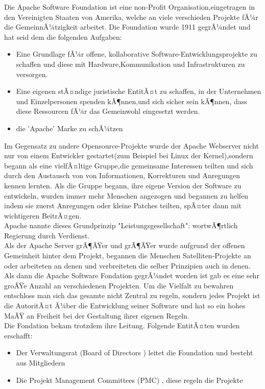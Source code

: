 



Die Apache Software Foundation ist eine non-Profit Organisation,eingetragen in den Vereinigten Staaten von Amerika, welche an viele verschieden Projekte fÃ¼r die GemeinnÃ¼tzigkeit arbeitet. Die Foundation wurde 1911 gegrÃ¼ndet und hat seid dem die folgenden Aufgaben:
\begin{itemize}
\item{Eine Grundlage fÃ¼r offene, kollaborative Software-Entwicklungsprojekte zu schaffen und diese mit Hardware,Kommunikation und Infrastrukturen zu versorgen. }
\item{Eine eigenen stÃ¤ndige juristische EntitÃ¤t zu schaffen, in der Unternehmen und Einzelpersonen spenden kÃ¶nnen,und sich sicher sein kÃ¶nnen, dass diese Ressourcen fÃ¼r das Gemeinwohl eingesetzt werden.}
\item{die 'Apache' Marke zu schÃ¼tzen}
\end{itemize}
Im Gegensatz zu andere Opensource-Projekte wurde der Apache Webserver nicht nur von einem Entwickler gestartet(zum Beispiel bei Linux der Kernel),sondern begann als eine vielfÃ¤ltige Gruppe,die gemeinsame Interessen teilten und sich durch den Austausch von  von Informationen, Korrekturen und Anregungen kennen lernten.
Als die Gruppe begann, ihre eigene Version der Software zu entwickeln, wurden immer mehr Menschen angezogen und begannen zu helfen indem sie zuerst Anregungen oder kleine Patches teilten, spÃ¤ter dann mit wichtigeren BeitrÃ¤gen. \\
Apache nannte dieses Grundprinzip "Leistungsgesellschaft": wortwÃ¶rtlich Regierung durch Verdienst.\\
Als der Apache Server grÃ¶ÃŸer und grÃ¶ÃŸer wurde aufgrund der offenen Gemeinheit hinter dem Projekt, begannen die Menschen Satelliten-Projekte an oder arbeiteten an denen und verbreiteten die selber Prinzipien auch in denen. Als dann die Apache Software Fondation gegrÃ¼ndet worden ist gab es eine sehr groÃŸe Anzahl an verschiedenen Projekten. Um die Vielfalt zu bewahren entschloss man sich das gesamte nicht Zentral zu regeln, sondern jedes Projekt ist die AutoritÃ¤t Ã¼ber die Entwicklung seiner Software und hat so ein hohes MaÃŸ an Freiheit bei der Gestaltung ihrer eigenen Regeln. \\
 \newpage 
Die Fondation bekam trotzdem ihre Leitung. Folgende EntitÃ¤ten wurden erschafft:
\begin{itemize}
\item{Der Verwaltungsrat (Board of Directors ) leitet die Foundation und besteht aus Mitgliedern}
\item{Die Projekt Management Committees (PMC) , diese regeln die Projekte}
\end{itemize}

